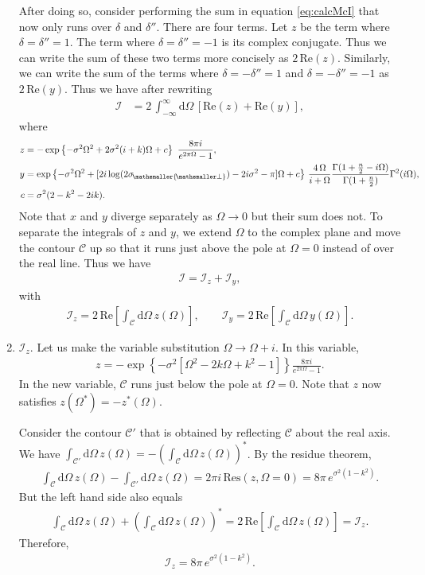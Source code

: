 \documentclass[11pt, a4paper]{article}
\newcommand{\Om}{\Omega}
\newcommand{\si}{{\sigma}}
\newcommand{\mc}[1]{\mathcal{#1}}
\renewcommand{\Re}{\mathrm{Re}}
\let\perptmp\perp
\renewcommand{\perp}{{\! \mathsmaller{\perptmp}}}
\begin{document}
\begin{enumerate}
After doing so, consider performing the sum in equation \ref{eq:calcMcI} that now only runs over $\delta$ and $\delta''$. There are four terms. Let $z$ be the term where $\delta=\delta''=1$. The term where $\delta=\delta''=-1$ is its complex conjugate. Thus we can write the sum of these two terms more concisely as $2\,\Re(z)$. 
Similarly, we can write the sum of the terms where $\delta=-\delta''=1$ and $\delta=-\delta''=-1$ as $2\,\Re(y)$. Thus we have after rewriting 
\begin{align*}
\mathcal I&=2\,\int_{-\infty}^{\infty}\!\!\mathrm{d} \Om\,[\Re(z)+\Re(y)],
\end{align*}
where
\begin{align*}
z&=-\exp\left\{-\si^2\Om^2+2\si^2(i+k)\Om+c\right\}\ \frac{8\pi i}{e^{2\pi\Om}-1} ,\\
y&=\exp\left\{-\si^2\Om^2+[2i\log(2\si_\perp)-2i\si^2-\pi]\Om+c\right\}\,\frac{4\,\Om }{i+\Om}\frac{\Gamma(1+\frac{n}{2}-i\Om)}{\Gamma(1+\frac{n}{2})}\Gamma^2(i\Om),\\
c&=\si^2(2-k^2-2ik).
\end{align*}
Note that $x$ and $y$ diverge separately as $\Om\to 0$ but their sum does not. To separate the integrals of $z$ and $y$, we extend $\Om$ to the complex plane and move the contour $\mc C$ up so that it runs just above the pole at $\Om=0$ instead of over the real line. Thus we have 
\begin{align*}
\mathcal I=\mathcal I_z+\mathcal I_y,
\end{align*}
with
\begin{align*}
\mathcal I_z=2\,\Re[\int_{\mathcal C}\mathrm d\Om\,z(\Om)],\qquad 
\mathcal I_y=2\,\Re[\int_{\mathcal C}\mathrm d\Om\,y(\Om)].
\end{align*}

\item $\mathcal I_z$.
Let us make the variable substitution $\Om\to \Om+i$. In this variable,
\begin{align*}
z=-\exp\left\{-\si^2[\Om^2-2k\Om+k^2-1]\right\}\frac{8\pi i}{e^{2\pi \Om}-1}.
\end{align*}
In the new variable, $\mathcal C$ runs just below the pole at $\Om=0$. Note that $z$ now satisfies $z(\Om^*)=-z^*(\Om)$.
 
Consider the contour $\mathcal C'$ that is obtained by reflecting $\mathcal C$ about the real axis. We have $\int_{\mathcal C'}\mathrm d\Om\,z(\Om)=-(\int_{\mathcal C}\mathrm d\Om\,z(\Om))^*$. By the residue theorem, 
\begin{align*}
\int_{\mathcal C}\mathrm d\Om\,z(\Om)-\int_{\mathcal C'}\mathrm d\Om\,z(\Om)=2 \pi i\, \mathrm{Res}(z,\Om=0)=8\pi \,e^{\si ^2(1-k^2)}.
\end{align*}
But the left hand side also equals
\begin{align*}
\int_{\mathcal C}\mathrm d\Om\,z(\Om)+\left(\int_{\mathcal C}\mathrm d\Om\,z(\Om)\right)^*=2\,\Re\left[\int_{\mathcal C}\mathrm d\Om\,z(\Om)\right]=\mathcal I_z.
\end{align*}
Therefore, 
\begin{align*}
\mathcal I_z=8\pi \,e^{\si^2(1-k^2)}.
\end{align*}


\end{enumerate}
\end{document}
